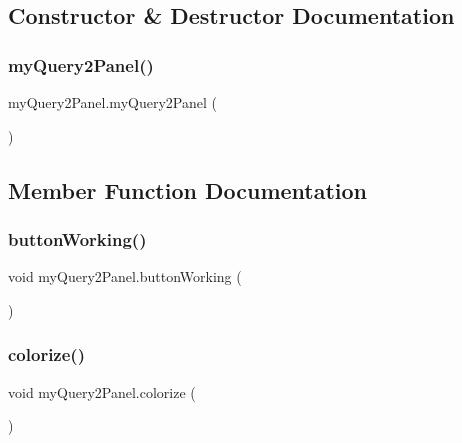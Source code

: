 \subsection{Constructor \& Destructor Documentation}
\hypertarget{classmy_query2_panel_a6bc36043976b346eb7e46eea21956042}{}\label{classmy_query2_panel_a6bc36043976b346eb7e46eea21956042} 
\subsubsection{\texorpdfstring{my\+Query2\+Panel()}{myQuery2Panel()}}
{\footnotesize\ttfamily my\+Query2\+Panel.\+my\+Query2\+Panel (\begin{DoxyParamCaption}{ }\end{DoxyParamCaption})}



\subsection{Member Function Documentation}
\hypertarget{classmy_query2_panel_a7ff73944523f85b4c3a79a4c019f73d3}{}\label{classmy_query2_panel_a7ff73944523f85b4c3a79a4c019f73d3} 
\subsubsection{\texorpdfstring{button\+Working()}{buttonWorking()}}
{\footnotesize\ttfamily void my\+Query2\+Panel.\+button\+Working (\begin{DoxyParamCaption}{ }\end{DoxyParamCaption})}

\hypertarget{classmy_query2_panel_adc03fb0398ab530769a51ae88531349a}{}\label{classmy_query2_panel_adc03fb0398ab530769a51ae88531349a} 
\subsubsection{\texorpdfstring{colorize()}{colorize()}}
{\footnotesize\ttfamily void my\+Query2\+Panel.\+colorize (\begin{DoxyParamCaption}{ }\end{DoxyParamCaption})\hspace{0.3cm}{\ttfamily [private]}}

